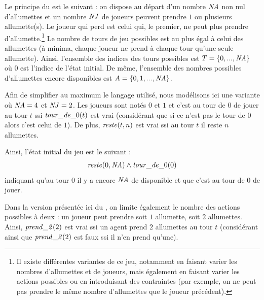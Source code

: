 

Le principe du \game est le suivant : on dispose au départ d'un nombre $\nbAllumettes$ non nul d'allumettes
et un nombre $\nbJoueurs$ de joueurs peuvent prendre $1$ ou plusieurs allumette(s). Le joueur qui perd est celui qui, le premier, ne peut plus prendre d'allumette.\footnote{Il existe différentes variantes de ce jeu, notamment en faisant varier les nombres d'allumettes et de joueurs, mais également en faisant varier les actions possibles ou en introduisant des contraintes (par exemple, on ne peut pas prendre le même nombre d'allumettes que le joueur précédent).} Le nombre de tours de jeu possibles est au plus égal à celui des allumettes (à minima, chaque joueur ne prend à chaque tour qu'une seule allumette). Ainsi, l'ensemble des indices des tours possibles est $\turnsSet = \{ 0, ..., \nbAllumettes \}$ où $0$ est l'indice de l'état initial. De même, l'ensemble des nombres possibles d'allumettes encore disponibles est $\matchesSet = \{ 0, 1, ..., \nbAllumettes \}$.

Afin de simplifier au maximum le langage utilisé, nous modélisons ici une variante où $\nbAllumettes = 4$ et $\nbJoueurs = 2$. Les joueurs sont notés $0$ et $1$ et c'est au tour de $0$ de jouer au tour $t$ ssi $\turn{t}$ est vrai (considérant que si ce n'est pas le tour de $0$ alors c'est celui de $1$). De plus, $\rest{t}{n}$ est vrai ssi au tour $t$ il reste $n$ allumettes.

Ainsi, l'état initial du jeu est le suivant : 
\begin{gather}
\rest{0}{\nbAllumettes} \land \turn{0}
\label{eq:initialState}
\end{gather}
indiquant qu'au tour $0$ il y a encore $\nbAllumettes$ de disponible et que c'est au tour de $0$ de jouer.

Dans la version présentée ici du \game, on limite également le nombre des actions possibles à deux : un joueur peut prendre soit $1$ allumette, soit $2$ allumettes. Ainsi, $\takes{t}$ est vrai ssi un agent prend $2$ allumettes au tour $t$ (considérant ainsi que $\takes{t}$ est faux ssi il n'en prend qu'une). 

